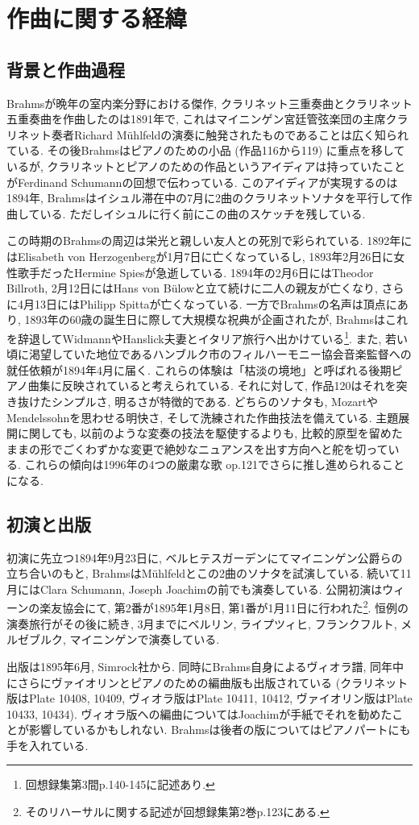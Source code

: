 
\chapter{作曲に関する経緯}

\section{背景と作曲過程}

Brahmsが晩年の室内楽分野における傑作, クラリネット三重奏曲とクラリネット五重奏曲を作曲したのは1891年で,
これはマイニンゲン宮廷管弦楽団の主席クラリネット奏者Richard Mühlfeldの演奏に触発されたものであることは広く知られている.
その後Brahmsはピアノのための小品 (作品116から119) に重点を移しているが,
クラリネットとピアノのための作品というアイディアは持っていたことがFerdinand Schumannの回想で伝わっている\cite{library}.
このアイディアが実現するのは1894年, Brahmsはイシュル滞在中の7月に2曲のクラリネットソナタを平行して作曲している\cite{compos}.
ただしイシュルに行く前にこの曲のスケッチを残している\cite{library}.

この時期のBrahmsの周辺は栄光と親しい友人との死別で彩られている.
1892年にはElisabeth von Herzogenbergが1月7日に亡くなっているし, 1893年2月26日に女性歌手だったHermine Spiesが急逝している.
1894年の2月6日にはTheodor Billroth, 2月12日にはHans von Bülowと立て続けに二人の親友が亡くなり, さらに4月13日にはPhilipp Spittaが亡くなっている.
一方でBrahmsの名声は頂点にあり, 1893年の60歳の誕生日に際して大規模な祝典が企画されたが,
Brahmsはこれを辞退してWidmannやHanslick夫妻とイタリア旅行へ出かけている\footnote{回想録集第3間p.140-145に記述あり.}.
また, 若い頃に渇望していた地位であるハンブルク市のフィルハーモニー協会音楽監督への就任依頼が1894年4月に届く.
これらの体験は「枯淡の境地」と呼ばれる後期ピアノ曲集に反映されていると考えられている.
それに対して, 作品120はそれを突き抜けたシンプルさ, 明るさが特徴的である.
どちらのソナタも, MozartやMendelssohnを思わせる明快さ, そして洗練された作曲技法を備えている.
主題展開に関しても, 以前のような変奏の技法を駆使するよりも,
比較的原型を留めたままの形でごくわずかな変更で絶妙なニュアンスを出す方向へと舵を切っている.
これらの傾向は1996年の4つの厳粛な歌 op.121でさらに推し進められることになる.


\section{初演と出版}

初演に先立つ1894年9月23日に, ベルヒテスガーデンにてマイニンゲン公爵らの立ち合いのもと, BrahmsはMühlfeldとこの2曲のソナタを試演している\cite{compos}.
続いて11月にはClara Schumann, Joseph Joachimの前でも演奏している\cite{henle}.
公開初演はウィーンの楽友協会にて, 第2番が1895年1月8日, 第1番が1月11日に行われた\footnote{そのリハーサルに関する記述が回想録集第2巻p.123にある.}\cite{library}.
恒例の演奏旅行がその後に続き, 3月までにベルリン, ライプツィヒ, フランクフルト, メルゼブルク, マイニンゲンで演奏している\cite{compos}.


出版は1895年6月, Simrock社から. 同時にBrahms自身によるヴィオラ譜,
同年中にさらにヴァイオリンとピアノのための編曲版も出版されている\cite{imslp}
(クラリネット版はPlate 10408, 10409, ヴィオラ版はPlate 10411, 10412, ヴァイオリン版はPlate 10433, 10434).
ヴィオラ版への編曲についてはJoachimが手紙でそれを勧めたことが影響しているかもしれない\cite{cd}.
Brahmsは後者の版についてはピアノパートにも手を入れている.
